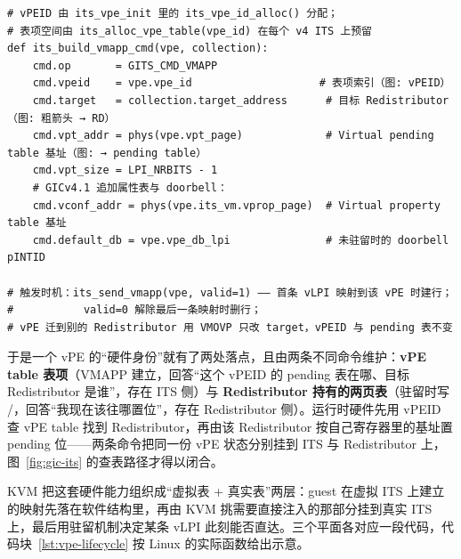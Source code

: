 \begin{lstlisting}[caption={vPE table 一行 = 一条 VMAPP 命令：its\_build\_vmapp\_cmd 的字段与图~\ref{fig:gic-its} 的对应（irq-gic-v3-its.c，节选）},label={lst:vmapp},style=pseudopy]
# vPEID 由 its_vpe_init 里的 its_vpe_id_alloc() 分配；
# 表项空间由 its_alloc_vpe_table(vpe_id) 在每个 v4 ITS 上预留
def its_build_vmapp_cmd(vpe, collection):
    cmd.op       = GITS_CMD_VMAPP
    cmd.vpeid    = vpe.vpe_id                    # 表项索引（图: vPEID）
    cmd.target   = collection.target_address      # 目标 Redistributor（图: 粗箭头 → RD）
    cmd.vpt_addr = phys(vpe.vpt_page)             # Virtual pending table 基址（图: → pending table）
    cmd.vpt_size = LPI_NRBITS - 1
    # GICv4.1 追加属性表与 doorbell：
    cmd.vconf_addr = phys(vpe.its_vm.vprop_page)  # Virtual property table 基址
    cmd.default_db = vpe.vpe_db_lpi               # 未驻留时的 doorbell pINTID

# 触发时机：its_send_vmapp(vpe, valid=1) —— 首条 vLPI 映射到该 vPE 时建行；
#           valid=0 解除最后一条映射时删行；
# vPE 迁到别的 Redistributor 用 VMOVP 只改 target，vPEID 与 pending 表不变
\end{lstlisting}

于是一个 vPE 的“硬件身份”就有了两处落点，且由两条不同命令维护：\textbf{vPE table 表项}（VMAPP 建立，回答“这个 vPEID 的 pending 表在哪、目标 Redistributor 是谁”，存在 ITS 侧）与 \textbf{Redistributor 持有的两页表}（驻留时写 /，回答“我现在该往哪置位”，存在 Redistributor 侧）。运行时硬件先用 vPEID 查 vPE table 找到 Redistributor，再由该 Redistributor 按自己寄存器里的基址置 pending 位——两条命令把同一份 vPE 状态分别挂到 ITS 与 Redistributor 上，图~\ref{fig:gic-its} 的查表路径才得以闭合。

KVM 把这套硬件能力组织成“虚拟表 + 真实表”两层：guest 在虚拟 ITS 上建立的映射先落在软件结构里，再由 KVM 挑需要直接注入的那部分挂到真实 ITS 上，最后用驻留机制决定某条 vLPI 此刻能否直达。三个平面各对应一段代码，代码块~\ref{lst:vpe-lifecycle} 按 Linux 的实际函数给出示意。

